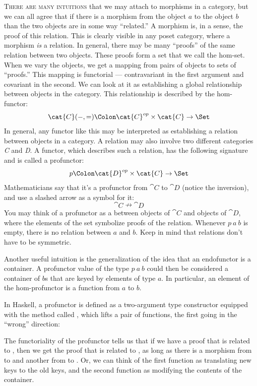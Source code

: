 
\lettrine[lhang=0.17]{T}{here are many intuitions} that we may attach to morphisms in a category,
but we can all agree that if there is a morphism from the object
$a$ to the object $b$ than the two objects are in some way
``related.'' A morphism is, in a sense, the proof of this relation. This
is clearly visible in any poset category, where a morphism \emph{is} a
relation. In general, there may be many ``proofs'' of the same relation
between two objects. These proofs form a set that we call the hom-set.
When we vary the objects, we get a mapping from pairs of objects to sets
of ``proofs.'' This mapping is functorial --- contravariant in the first
argument and covariant in the second. We can look at it as establishing
a global relationship between objects in the category. This relationship
is described by the hom-functor:
\[\cat{C}(-, =) \Colon \cat{C}^{op}\times{}\cat{C} \to \Set\]
In general, any functor like this may be interpreted as establishing a
relation between objects in a category. A relation may also involve two
different categories \emph{C} and \emph{D}. A functor, which describes
such a relation, has the following signature and is called a profunctor:
\[p \Colon \cat{D}^{op}\times{}\cat{C} \to \Set\]
Mathematicians say that it's a profunctor from $\cat{C}$ to $\cat{D}$
(notice the inversion), and use a slashed arrow as a symbol for it:
\[\cat{C} \nrightarrow \cat{D}\]
You may think of a profunctor as a 
between objects of $\cat{C}$ and objects of $\cat{D}$, where the elements
of the set symbolize proofs of the relation. Whenever $p\ a\ b$
is empty, there is no relation between $a$ and $b$. Keep
in mind that relations don't have to be symmetric.

Another useful intuition is the generalization of the idea that an
endofunctor is a container. A profunctor value of the type
$p\ a\ b$ could then be considered a container of $b$s
that are keyed by elements of type $a$. In particular, an element
of the hom-profunctor is a function from $a$ to $b$.

In Haskell, a profunctor is defined as a two-argument type constructor
 equipped with the method called , which lifts a
pair of functions, the first going in the ``wrong'' direction:

The functoriality of the profunctor tells us that if we have a proof
that  is related to , then we get the proof that
 is related to , as long as there is a morphism from
 to  and another from  to . Or,
we can think of the first function as translating new keys to the old
keys, and the second function as modifying the contents of the
container.

